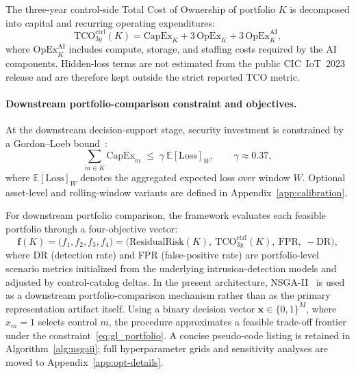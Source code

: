 \documentclass[preprint,12pt]{elsarticle}
\begin{document}
The three-year control-side Total Cost of Ownership of portfolio $K$ is decomposed into capital and recurring operating expenditures:
\begin{equation}
  \mathrm{TCO}^{\mathrm{ctrl}}_{3y}(K) =
      \mathrm{CapEx}_K + 3\,\mathrm{OpEx}_K + 3\,\mathrm{OpEx}^{\mathrm{AI}}_K,
  \label{eq:cm}
\end{equation}
where $\mathrm{OpEx}^{\mathrm{AI}}_K$ includes compute, storage, and staffing costs required by the AI components. Hidden-loss terms are not estimated from the public CIC~IoT~2023 release and are therefore kept outside the strict reported TCO metric.

\paragraph{Downstream portfolio-comparison constraint and objectives.}
At the downstream decision-support stage, security investment is constrained by a Gordon--Loeb bound~\cite{Gordon2002_SecInvest}:
\begin{equation}
  \sum_{m \in K} \mathrm{CapEx}_m \;\le\; \gamma\ \mathbb{E}[\mathrm{Loss}]_{W},
  \qquad \gamma \approx 0.37,
  \label{eq:gl_portfolio}
\end{equation}
where $\mathbb{E}[\mathrm{Loss}]_{W}$ denotes the aggregated expected loss over window $W$. Optional asset-level and rolling-window variants are defined in Appendix~\ref{app:calibration}.

For downstream portfolio comparison, the framework evaluates each feasible portfolio through a four-objective vector:
\begin{equation}
  \mathbf{f}(K) = \bigl(f_1, f_2, f_3, f_4\bigr)
                = \bigl(\mathrm{ResidualRisk}(K),\ \mathrm{TCO}^{\mathrm{ctrl}}_{3y}(K),\ \mathrm{FPR},\ -\mathrm{DR}\bigr),
  \label{eq:objectives_mo}
\end{equation}
where DR (detection rate) and FPR (false-positive rate) are portfolio-level scenario metrics initialized from the underlying intrusion-detection models and adjusted by control-catalog deltas. In the present architecture, NSGA-II~\cite{Deb2002_NSGAII} is used as a downstream portfolio-comparison mechanism rather than as the primary representation artifact itself. Using a binary decision vector $\mathbf{x}\in\{0,1\}^{M}$, where $x_m=1$ selects control $m$, the procedure approximates a feasible trade-off frontier under the constraint~\eqref{eq:gl_portfolio}. A concise pseudo-code listing is retained in Algorithm~\ref{alg:nsgaii}; full hyperparameter grids and sensitivity analyses are moved to Appendix~\ref{app:opt-details}.
\end{document}
